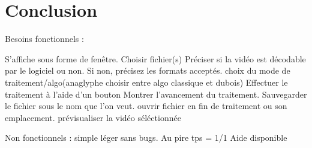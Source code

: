 \documentclass[10pt,a4paper]{article}
\begin{document}
\section{Conclusion}





Besoins fonctionnels : 

S'affiche sous forme de fenêtre.
Choisir fichier(s)
Préciser si la vidéo est décodable par le logiciel ou non. Si non, précisez les formats acceptés.
choix du mode de traitement/algo(anaglyphe choisir entre algo classique et dubois)
Effectuer le traitement à l'aide d'un bouton
Montrer l'avancement du traitement.
Sauvegarder le fichier sous le nom que l'on veut.
ouvrir fichier en fin de traitement ou son emplacement.
prévisualiser la vidéo séléctionnée

Non fonctionnels :
simple
léger
sans bugs.
Au pire tps = 1/1
Aide disponible 
\end{document}

